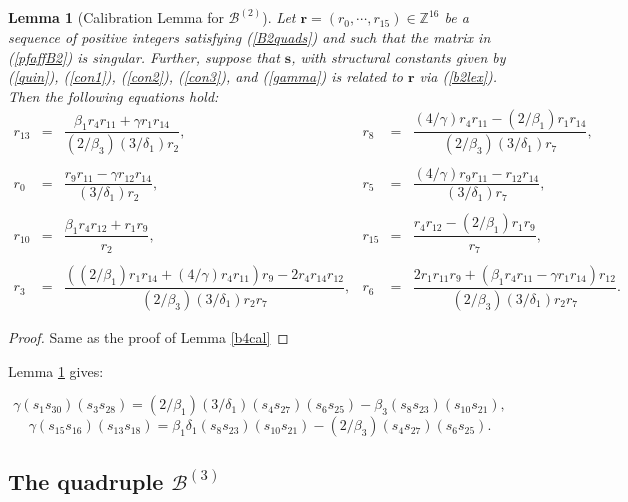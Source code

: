 \documentclass[letterpaper,10pt]{amsart}
\newcommand{\bZ}{{\mathbb{Z}}}
\newcommand{\Br}{{\mathbf{r}}}
\newcommand{\Bs}{{\mathbf{s}}}
\newcommand{\B}{{\mathcal{B}}}
\newtheorem{lemma}[theorem]{Lemma}
\theoremstyle{definition}
\numberwithin{equation}{section}
\begin{document}
\begin{lemma}[Calibration Lemma for $\B^{(2)}$] \label{b2cal} Let $\Br = (r_0, \cdots, r_{15}) \in \bZ^{16}$ be a sequence of positive integers satisfying (\ref{B2quads}) and such that the matrix in (\ref{pfaffB2}) is singular. Further, suppose that $\Bs$, with structural constants given by (\ref{quin}), (\ref{con1}), (\ref{con2}), (\ref{con3}), and (\ref{gamma}) is related to $\Br$ via (\ref{b2lex}). Then the following equations hold:  
\begin{equation} \label{b2eqs} 
\begin{matrix} r_{13} & = & \dfrac{\beta_1 r_4 r_{11} + \gamma r_1 r_{14}}{(2/\beta_3)(3/ \delta_1) r_2}, & r_8 & = & \dfrac{ (4/\gamma) r_4 r_{11} - (2/\beta_1) r_1 r_{14}}{ (2/\beta_3)(3/ \delta_1) r_7}, \\ \\
r_0 & = & \dfrac{ r_9 r_{11} -  \gamma r_{12} r_{14}}{(3/\delta_1) r_2}, & r_5 & = & \dfrac{(4/\gamma) r_9 r_{11} -  r_{12} r_{14}}{(3/\delta_1) r_7}, \\ \\
r_{10} & = & \dfrac{\beta_1 r_{4} r_{12} + r_1 r_9}{ r_2}, & r_{15} & = & \dfrac{r_4 r_{12} - (2/\beta_1) r_1 r_9}{ r_7}, \\ \\
r_3 & = & \dfrac{((2/\beta_1) r_1 r_{14} + (4/\gamma) r_4 r_{11})r_9 - 2  r_4 r_{14} r_{12}}{ (2/\beta_3) (3/\delta_1) r_2 r_7}, & r_6 & = & \dfrac{2 r_1 r_{11} r_9 +  (\beta_1 r_4 r_{11} -  \gamma r_1 r_{14})r_{12}}{(2/\beta_3) (3/\delta_1) r_2 r_7}.
\end{matrix}
\end{equation}
\end{lemma}

\begin{proof} Same as the proof of Lemma \ref{b4cal}
\end{proof}


Lemma \ref{b2cal} gives:

\begin{equation} \label{b2caleq} \gamma  (s_1 s_{30})(s_3 s_{28}) = (2/\beta_1)(3/\delta_1) (s_4 s_{27})(s_6 s_{25}) - \beta_3 (s_8 s_{23})(s_{10} s_{21}), \end{equation}
\[\gamma  (s_{15} s_{16})(s_{13} s_{18}) = \beta_1 \delta_1 (s_8 s_{23})(s_{10} s_{21}) - (2/\beta_3) (s_4 s_{27})(s_6 s_{25}). \]

\subsection{The quadruple $\B^{(3)}$}
\label{B3par} 
\end{document}
